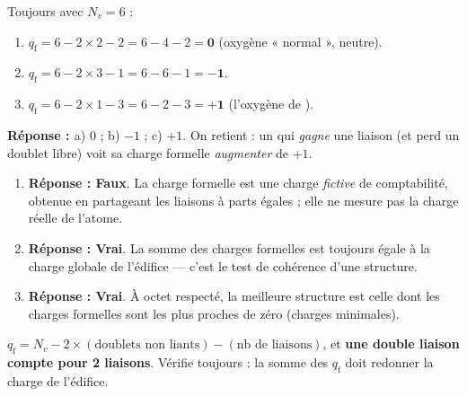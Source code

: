 \documentclass[11pt,a4paper]{article}
\newcommand{\rep}{\textbf{\textcolor{corcol}{Réponse : }}}
\begin{document}
\begin{cor}
Toujours avec $N_v = 6$ :
\begin{enumerate}[label=\alph*),leftmargin=2em,itemsep=2pt]
  \item $q_{\mathrm{f}} = 6 - 2\times 2 - 2 = 6 - 4 - 2 = \mathbf{0}$ (oxygène « normal », neutre).
  \item $q_{\mathrm{f}} = 6 - 2\times 3 - 1 = 6 - 6 - 1 = \mathbf{-1}$.
  \item $q_{\mathrm{f}} = 6 - 2\times 1 - 3 = 6 - 2 - 3 = \mathbf{+1}$ (l'oxygène de ).
\end{enumerate}
\rep a) $0$ ; \; b) $-1$ ; \; c) $+1$. On retient : un  qui \emph{gagne} une liaison
(et perd un doublet libre) voit sa charge formelle \emph{augmenter} de $+1$.
\end{cor}

\begin{cor}
\begin{enumerate}[label=\alph*),leftmargin=2em,itemsep=2pt]
  \item \rep \textbf{Faux}. La charge formelle est une charge \emph{fictive} de comptabilité, obtenue
        en partageant les liaisons à parts égales ; elle ne mesure pas la charge réelle de l'atome.
  \item \rep \textbf{Vrai}. La somme des charges formelles est toujours égale à la charge globale de
        l'édifice — c'est le test de cohérence d'une structure.
  \item \rep \textbf{Vrai}. À octet respecté, la meilleure structure est celle dont les charges
        formelles sont les plus proches de zéro (charges minimales).
\end{enumerate}
\end{cor}

\begin{astucebox}
$q_{\mathrm{f}} = N_v - 2\times(\text{doublets non liants}) - (\text{nb de liaisons})$, et
\textbf{une double liaison compte pour 2 liaisons}. Vérifie toujours : la somme des $q_{\mathrm{f}}$
doit redonner la charge de l'édifice.
\end{astucebox}
\end{document}
